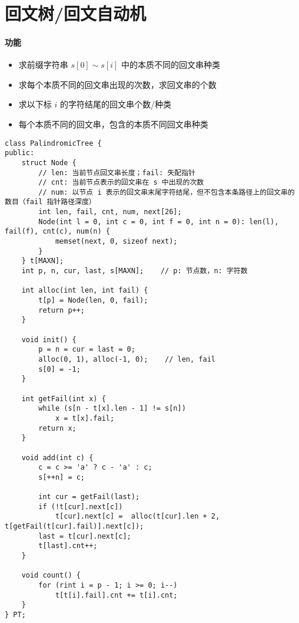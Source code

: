 \section{回文树/回文自动机}
\paragraph{功能}
\begin{itemize}
\item 求前缀字符串 $s[0] \sim s[i]$ 中的本质不同的回文串种类
\item 求每个本质不同的回文串出现的次数，求回文串的个数
\item 求以下标 $i$ 的字符结尾的回文串个数/种类
\item 每个本质不同的回文串，包含的本质不同回文串种类
\end{itemize}
\begin{verbatim}
class PalindromicTree {
public:
    struct Node {
        // len: 当前节点回文串长度；fail: 失配指针
        // cnt: 当前节点表示的回文串在 s 中出现的次数
        // num: 以节点 i 表示的回文串末尾字符结尾，但不包含本条路径上的回文串的数目（fail 指针路径深度） 
        int len, fail, cnt, num, next[26];
        Node(int l = 0, int c = 0, int f = 0, int n = 0): len(l), fail(f), cnt(c), num(n) {
            memset(next, 0, sizeof next);
        }
    } t[MAXN];
    int p, n, cur, last, s[MAXN];    // p: 节点数，n: 字符数
    
    int alloc(int len, int fail) {
        t[p] = Node(len, 0, fail);
        return p++;
    }
    
    void init() {
        p = n = cur = last = 0;
        alloc(0, 1), alloc(-1, 0);    // len, fail
        s[0] = -1;
    }
    
    int getFail(int x) {
        while (s[n - t[x].len - 1] != s[n])
            x = t[x].fail;
        return x;
    }
    
    void add(int c) {
        c = c >= 'a' ? c - 'a' : c;
        s[++n] = c;
        
        int cur = getFail(last);
        if (!t[cur].next[c])
            t[cur].next[c] =  alloc(t[cur].len + 2, t[getFail(t[cur].fail)].next[c]);
        last = t[cur].next[c];
        t[last].cnt++;
    }
    
    void count() {
        for (rint i = p - 1; i >= 0; i--)
            t[t[i].fail].cnt += t[i].cnt;
    }
} PT;
\end{verbatim}

